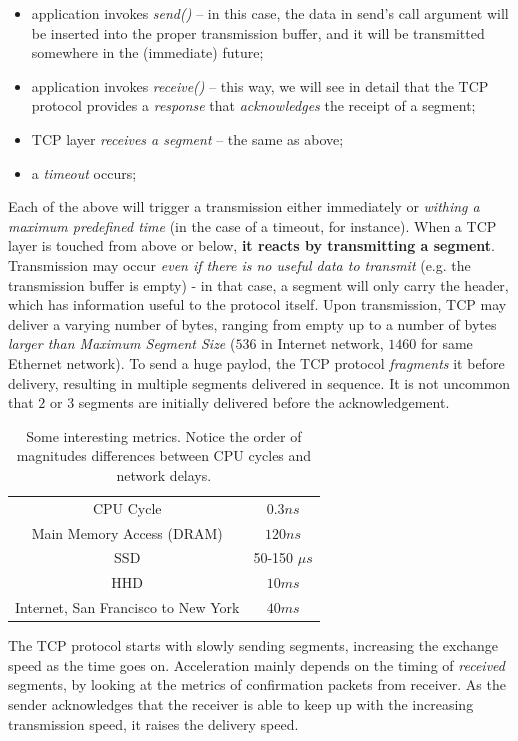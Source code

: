 \documentclass[a4paper, 11pt]{report}
\begin{document}
\begin{itemize}
    \item application invokes \emph{send()} \--- in this case, the data in
        send's call argument will be inserted into the proper transmission
        buffer, and it will be transmitted somewhere in the (immediate) future;
    \item application invokes \emph{receive()} \--- this way, we will see in
        detail that the TCP protocol provides a \emph{response} that
        \emph{acknowledges} the receipt of a segment;
	\item TCP layer \emph{receives a segment} \--- the same as above;
	\item a \emph{timeout} occurs;
\end{itemize}

Each of the above will trigger a transmission either immediately or
\emph{withing a maximum predefined time} (in the case of a timeout, for
instance). When a TCP layer is touched from above or below, \textbf{it reacts
by transmitting a segment}. Transmission may occur \emph{even if there is no
useful data to transmit} (e.g. the transmission buffer is empty) \-- in that
case, a segment will only carry the header, which has information useful to the
protocol itself. Upon transmission, TCP may deliver a varying number of bytes,
ranging from empty up to a number of bytes \emph{larger than Maximum Segment
Size} ($536$ in Internet network, $1460$ for same Ethernet network). To send a
huge paylod, the TCP protocol \emph{fragments} it before delivery, resulting in
multiple segments delivered in sequence. It is not uncommon that $2$ or $3$
segments are initially delivered before the acknowledgement.

\begin{table}[ht]
\centering
\begin{tabular}{cc}
CPU Cycle & $0.3 ns$ \\
Main Memory Access (DRAM) & $120ns$ \\
SSD & 50-150 $\mu s$ \\
HHD & $10 ms$ \\
Internet, San Francisco to New York & $40ms$
\end{tabular}
\caption{Some interesting metrics. Notice the order of magnitudes differences
between CPU cycles and network delays.}\label{tab:SomeMetrics}
\end{table}
\bigskip

The TCP protocol starts with slowly sending segments, increasing the exchange
speed as the time goes on. Acceleration mainly depends on the timing of
\emph{received} segments, by looking at the metrics of confirmation packets
from receiver. As the sender acknowledges that the receiver is able to keep up
with the increasing transmission speed, it raises the delivery speed.
\end{document}
